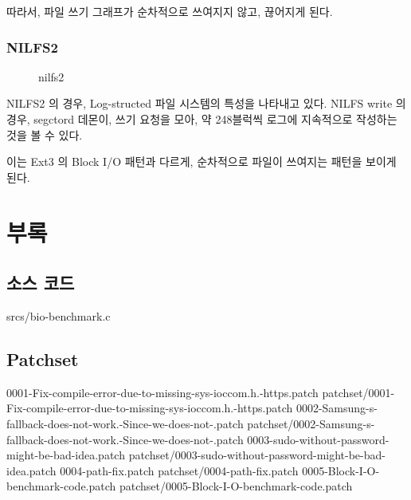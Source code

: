\documentclass {article}
\begin{document}
따라서, 파일 쓰기 그래프가 순차적으로 쓰여지지 않고, 끊어지게 된다.
\subsubsection{NILFS2}
\begin{figure} [h!]
  \caption{nilfs2}
  \begin{center}
    \resizebox{0.5\textwidth}{!}{
      
    }
  \end{center}
\end{figure}
NILFS2 의 경우, Log-structed 파일 시스템의 특성을 나타내고 있다. NILFS write 의 경우, segctord 데몬이, 쓰기 요청을 모아, 약 248블럭씩 로그에 지속적으로 작성하는 것을 볼 수 있다.

이는 Ext3 의 Block I/O 패턴과 다르게, 순차적으로 파일이 쓰여지는 패턴을 보이게 된다.

\newpage
\section{부록}
\subsection{소스 코드}
{srcs/bio-benchmark.c}
\subsection{Patchset}
\setlength{\parindent}{0cm}
0001-Fix-compile-error-due-to-missing-sys-ioccom.h.-https.patch
{patchset/0001-Fix-compile-error-due-to-missing-sys-ioccom.h.-https.patch}
0002-Samsung-s-fallback-does-not-work.-Since-we-does-not-.patch
{patchset/0002-Samsung-s-fallback-does-not-work.-Since-we-does-not-.patch}
0003-sudo-without-password-might-be-bad-idea.patch
{patchset/0003-sudo-without-password-might-be-bad-idea.patch}
0004-path-fix.patch
{patchset/0004-path-fix.patch}
0005-Block-I-O-benchmark-code.patch
{patchset/0005-Block-I-O-benchmark-code.patch}
\end{document}
